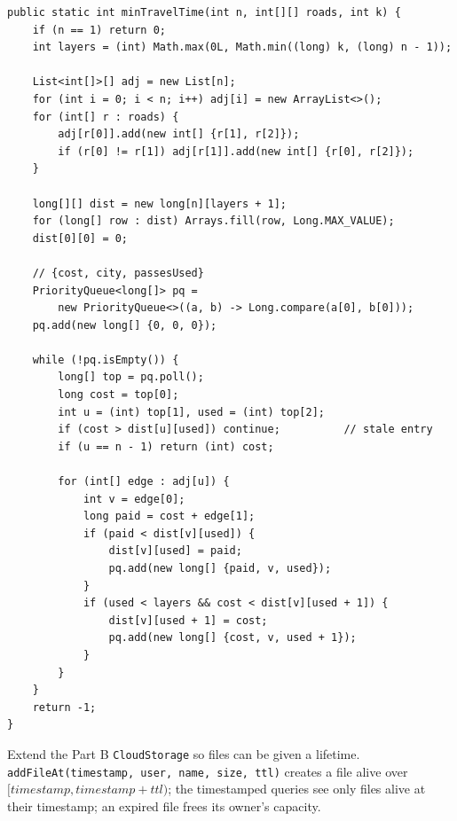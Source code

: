 \solheading
\begin{lstlisting}[style=java]
public static int minTravelTime(int n, int[][] roads, int k) {
    if (n == 1) return 0;
    int layers = (int) Math.max(0L, Math.min((long) k, (long) n - 1));

    List<int[]>[] adj = new List[n];
    for (int i = 0; i < n; i++) adj[i] = new ArrayList<>();
    for (int[] r : roads) {
        adj[r[0]].add(new int[] {r[1], r[2]});
        if (r[0] != r[1]) adj[r[1]].add(new int[] {r[0], r[2]});
    }

    long[][] dist = new long[n][layers + 1];
    for (long[] row : dist) Arrays.fill(row, Long.MAX_VALUE);
    dist[0][0] = 0;

    // {cost, city, passesUsed}
    PriorityQueue<long[]> pq =
        new PriorityQueue<>((a, b) -> Long.compare(a[0], b[0]));
    pq.add(new long[] {0, 0, 0});

    while (!pq.isEmpty()) {
        long[] top = pq.poll();
        long cost = top[0];
        int u = (int) top[1], used = (int) top[2];
        if (cost > dist[u][used]) continue;          // stale entry
        if (u == n - 1) return (int) cost;

        for (int[] edge : adj[u]) {
            int v = edge[0];
            long paid = cost + edge[1];
            if (paid < dist[v][used]) {
                dist[v][used] = paid;
                pq.add(new long[] {paid, v, used});
            }
            if (used < layers && cost < dist[v][used + 1]) {
                dist[v][used + 1] = cost;
                pq.add(new long[] {cost, v, used + 1});
            }
        }
    }
    return -1;
}
\end{lstlisting}



Extend the Part B \texttt{CloudStorage} so files can be given a lifetime.
\texttt{addFileAt(timestamp, user, name, size, ttl)} creates a file alive over
$[\textit{timestamp}, \textit{timestamp}+\textit{ttl})$; the timestamped
queries see only files alive at their timestamp; an expired file frees its
owner's capacity.

